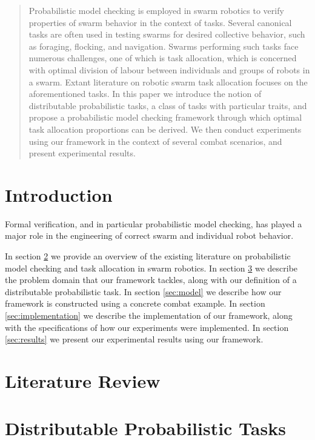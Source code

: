 \documentclass{article}
\theoremstyle{definition}
\begin{document}
\begin{abstract}
    Probabilistic model checking is employed
    in swarm robotics to verify
    properties of swarm behavior in the context of
    tasks. Several canonical tasks are often used
    in testing swarms for desired collective behavior,
    such as foraging, flocking, and navigation.
    Swarms performing such tasks face numerous challenges,
    one of which is task allocation, which is concerned 
    with optimal division of labour between individuals 
    and groups of robots in a swarm.  Extant literature 
    on robotic swarm task allocation focuses on the 
    aforementioned tasks. In this paper we introduce the
    notion of distributable probabilistic tasks,
    a class of tasks with particular traits, and
    propose a probabilistic model checking framework
    through which optimal task allocation proportions
    can be derived. We then conduct experiments using our
    framework in the context of several combat scenarios,
    and present experimental results.
\end{abstract}

\section{Introduction}\label{sec:intro}

Formal verification, and in particular probabilistic model
checking, has played a major role in the engineering of
correct swarm and individual robot behavior. %

In section \ref{sec:lit-review} we provide an overview of the
existing literature on probabilistic model checking and
task allocation in swarm robotics. In section \ref{sec:dpts}
we describe the problem domain that our framework tackles,
along with our definition of a distributable probabilistic
task. In section \ref{sec:model} we describe how our framework
is constructed using a concrete combat example. In section
\ref{sec:implementation} we describe the implementation of
our framework, along with the specifications of how our
experiments were implemented. In section \ref{sec:results}
we present our experimental results using our framework.

\section{Literature Review}\label{sec:lit-review}

\section{Distributable Probabilistic Tasks}\label{sec:dpts}
\end{document}
